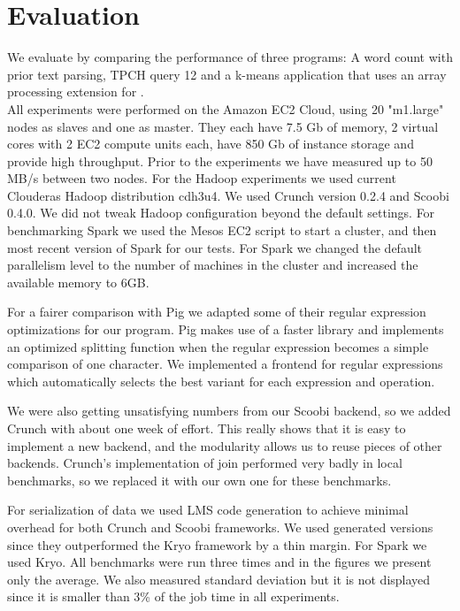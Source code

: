 \section{Evaluation}
\label{sec:evaluation}

We evaluate \tool by comparing the performance of three programs: A word count with prior text parsing, TPCH query 12 and a k-means application that uses an array processing extension for \tool. \\

All experiments were performed on the Amazon EC2 Cloud, using 20 "m1.large" nodes as slaves and one as master. They each have 7.5 Gb of memory, 2 virtual cores with 2 EC2 compute units each, have 850 Gb of instance storage and provide high throughput. Prior to the experiments we have measured up to 50 MB/s between two nodes. For the Hadoop experiments we used current Clouderas Hadoop distribution cdh3u4. We used Crunch version 0.2.4 and Scoobi 0.4.0. We did not tweak Hadoop configuration beyond the default settings. For benchmarking Spark we used the Mesos \cite{hindman_mesos:_2011} EC2 script to start a cluster, and then most recent version of Spark for our tests.  For Spark we changed the default parallelism level to the number of machines in the cluster and increased the available memory to 6GB. 

For a fairer comparison with Pig we adapted some of their regular expression optimizations for our program. Pig makes use of a faster library  and implements an optimized splitting function when the regular expression becomes a simple comparison of one character. We implemented a frontend for regular expressions which automatically selects the best variant for each expression and operation. 

We were also getting unsatisfying numbers from our Scoobi backend, so we added Crunch with about one week of effort. This really shows that it is easy to implement a new backend, and the modularity allows us to reuse pieces of other backends. Crunch's implementation of join performed very badly in local benchmarks, so we replaced it with our own one for these benchmarks.

For serialization of data we used LMS code generation to achieve minimal overhead for both Crunch and Scoobi frameworks. We used generated versions since they outperformed the Kryo framework by a thin margin. For Spark we used Kryo. All benchmarks were run three times and in the figures we present only the average. We also measured standard deviation but it is not displayed since it is smaller than 3\% of the job time in all experiments.


